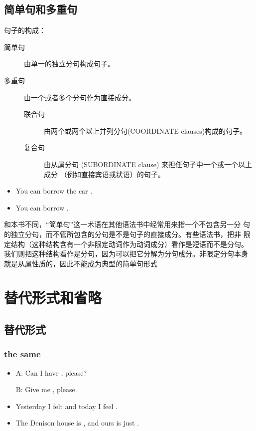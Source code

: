 \subsection{简单句和多重句}

句子的构成：
\begin{description}
\item[简单句] 由单一的独立分句构成句子。
\item[多重句] 由一个或者多个分句作为直接成分。
  \begin{description}
  \item [联合句] 由两个或两个以上并列分句(COORDINATE clauses)构成的句子。
  \item [复合句] 由从属分句 (SUBORDINATE clause) 来担任句子中一个或一个以上成分
    （例如直接宾语或状语）的句子。
  \end{description}
\end{description}

\begin{itemize}
\item You can borrow the car .
\item You can borrow .
\end{itemize}

和本书不同，“简单句”这一术语在其他语法书中经常用来指一个不包含另一分
句的独立分句，而不管所包含的分句是不是句子的直接成分。有些语法书，把非
限定结构（这种结构含有一个非限定动词作为动词成分）看作是短语而不是分句。
我们则把这种结构看作是分句，因为可以把它分解为分句成分。非限定分句本身
就是从属性质的，因此不能成为典型的简单句形式

\section{替代形式和省略}

\subsection{替代形式}

\subsubsection{the same}

\begin{itemize}
\item A: Can I have , please?

  B: Give me , please.

\item Yesterday I felt  and today I feel .

\item The Denison house is , and ours is
  just .

\end{itemize}

